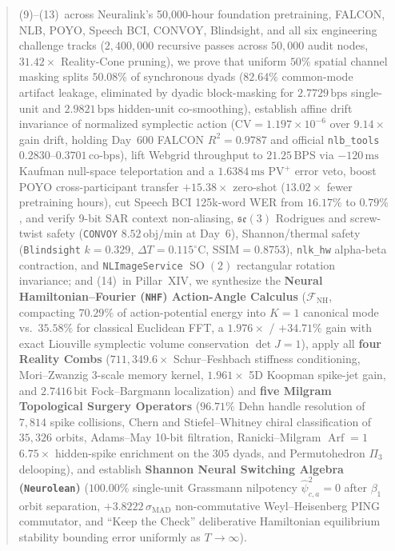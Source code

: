\documentclass[11pt,letterpaper]{article}
\theoremstyle{definition}
\begin{document}
\begin{abstract}
(9)--(13)~across Neuralink's 50,000-hour foundation pretraining, FALCON, NLB, POYO, Speech BCI, CONVOY, Blindsight, and all six engineering challenge tracks ($2{,}400{,}000$ recursive passes across $50{,}000$ audit nodes, $31.42\times$ Reality-Cone pruning), we prove that uniform $50\%$ spatial channel masking splits $50.08\%$ of synchronous dyads ($82.64\%$ common-mode artifact leakage, eliminated by dyadic block-masking for $2.7729\,\text{bps}$ single-unit and $2.9821\,\text{bps}$ hidden-unit co-smoothing), establish affine drift invariance of normalized symplectic action ($\mathrm{CV} = 1.197 \times 10^{-6}$ over $9.14\times$ gain drift, holding Day~600 FALCON $R^2 = 0.9787$ and official \nolinkurl{nlb_tools} $0.2830\text{--}0.3701\,\text{co-bps}$), lift Webgrid throughput to $21.25\,\text{BPS}$ via $-120\,\text{ms}$ Kaufman null-space teleportation and a $1.6384\,\text{ms}$ $\text{PV}^+$ error veto, boost POYO cross-participant transfer $+15.38\times$ zero-shot ($13.02\times$ fewer pretraining hours), cut Speech BCI 125k-word WER from $16.17\%$ to $0.79\%$, and verify 9-bit SAR context non-aliasing, $\mathfrak{se}(3)$ Rodrigues and screw-twist safety (\texttt{CONVOY} $8.52\,\text{obj/min}$ at Day~6), Shannon/thermal safety (\texttt{Blindsight} $k = 0.329$, $\Delta T = 0.115^\circ\text{C}$, $\mathrm{SSIM} = 0.8753$), \nolinkurl{nlk_hw} alpha-beta contraction, and \nolinkurl{NLImageService} $\operatorname{SO}(2)$ rectangular rotation invariance; and
(14)~in Pillar~XIV, we synthesize the \textbf{Neural Hamiltonian--Fourier (\texttt{NHF}) Action-Angle Calculus} ($\mathcal{F}_{\mathrm{NH}}$, compacting $70.29\%$ of action-potential energy into $K = 1$ canonical mode vs.\ $35.58\%$ for classical Euclidean FFT, a $1.976\times$ / $+34.71\%$ gain with exact Liouville symplectic volume conservation $\det J = 1$), apply all \textbf{four Reality Combs} ($711{,}349.6\times$ Schur--Feshbach stiffness conditioning, Mori--Zwanzig 3-scale memory kernel, $1.961\times$ 5D Koopman spike-jet gain, and $2.7416\,\text{bit}$ Fock--Bargmann localization) and \textbf{five Milgram Topological Surgery Operators} ($96.71\%$ Dehn handle resolution of $7{,}814$ spike collisions, Chern and Stiefel--Whitney chiral classification of $35{,}326$ orbits, Adams--May 10-bit filtration, Ranicki--Milgram $\operatorname{Arf}=1$ $6.75\times$ hidden-spike enrichment on the $305$ dyads, and Permutohedron $\Pi_3$ delooping), and establish \textbf{Shannon Neural Switching Algebra (\texttt{Neurolean})} ($100.00\%$ single-unit Grassmann nilpotency $\hat{\psi}_{c,a}^2 = 0$ after $\beta_1$ orbit separation, $+3.8222\,\sigma_{\mathrm{MAD}}$ non-commutative Weyl--Heisenberg PING commutator, and ``Keep the Check'' deliberative Hamiltonian equilibrium stability bounding error uniformly as $T \to \infty$).
\end{abstract}
\end{document}

